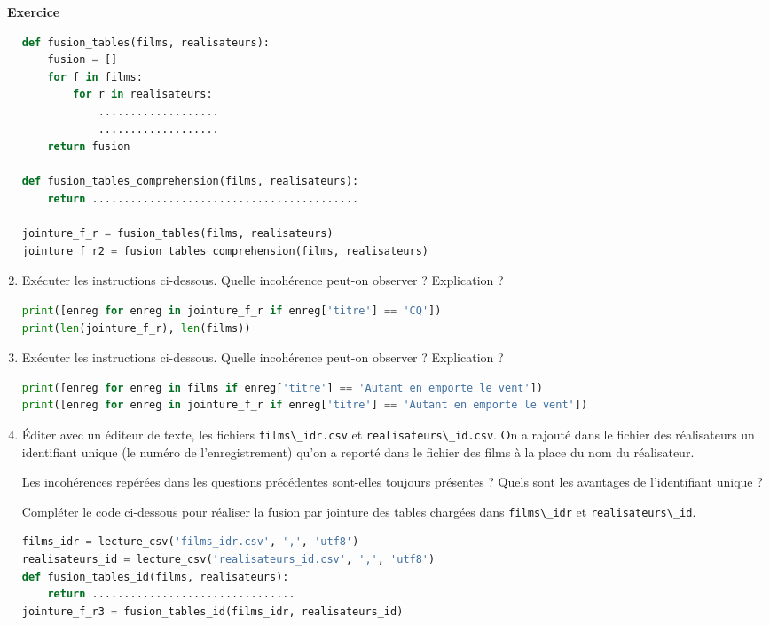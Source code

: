 \documentclass[
  11pt,
]{article}
\newcommand{\passthrough}[1]{#1}
\newcounter{exo}
\newenvironment{exercice}[1]
{\par \medskip   \addtocounter{exo}{1} \noindent  
\begin{bclogo}[arrondi =0.1,   noborder = true, logo=\bccrayon, marge=4]{~\textbf{Exercice} \textbf{\theexo} {\itshape #1} }  \par}
{
\end{bclogo}
 \par \bigskip }
\newcounter{def}
\begin{document}
\begin{exercice}{}
\begin{enumerate}
\begin{lstlisting}[language=Python]
def fusion_tables(films, realisateurs):
    fusion = []
    for f in films:
        for r in realisateurs:
            ...................
            ...................
    return fusion

def fusion_tables_comprehension(films, realisateurs):   
    return ..........................................

jointure_f_r = fusion_tables(films, realisateurs)
jointure_f_r2 = fusion_tables_comprehension(films, realisateurs)
\end{lstlisting}
\item
  Exécuter les instructions ci-dessous. Quelle incohérence peut-on
  observer ? Explication ?

\begin{lstlisting}[language=Python]
print([enreg for enreg in jointure_f_r if enreg['titre'] == 'CQ'])
print(len(jointure_f_r), len(films))
\end{lstlisting}
\item
  Exécuter les instructions ci-dessous. Quelle incohérence peut-on
  observer ? Explication ?

\begin{lstlisting}[language=Python]
print([enreg for enreg in films if enreg['titre'] == 'Autant en emporte le vent'])
print([enreg for enreg in jointure_f_r if enreg['titre'] == 'Autant en emporte le vent'])
\end{lstlisting}
\item
  Éditer avec un éditeur de texte, les fichiers
  \passthrough{\lstinline!films\_idr.csv!} et
  \passthrough{\lstinline!realisateurs\_id.csv!}. On a rajouté dans le
  fichier des réalisateurs un identifiant unique (le numéro de
  l'enregistrement) qu'on a reporté dans le fichier des films à la place
  du nom du réalisateur.

  Les incohérences repérées dans les questions précédentes sont-elles
  toujours présentes ? Quels sont les avantages de l'identifiant unique
  ?

  Compléter le code ci-dessous pour réaliser la fusion par jointure des
  tables chargées dans \passthrough{\lstinline!films\_idr!} et
  \passthrough{\lstinline!realisateurs\_id!}.

\begin{lstlisting}[language=Python]
films_idr = lecture_csv('films_idr.csv', ',', 'utf8')
realisateurs_id = lecture_csv('realisateurs_id.csv', ',', 'utf8')
def fusion_tables_id(films, realisateurs):   
    return ................................
jointure_f_r3 = fusion_tables_id(films_idr, realisateurs_id)
\end{lstlisting}
\end{enumerate}

\end{exercice}
\end{document}

